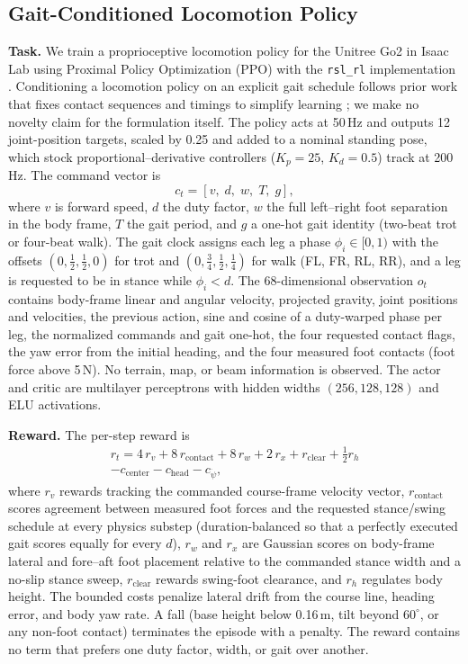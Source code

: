 \subsection{Gait-Conditioned Locomotion Policy}
\label{sec:inv3_policy}

\textbf{Task.} We train a proprioceptive locomotion policy for the Unitree Go2
in Isaac Lab using Proximal Policy Optimization (PPO) \cite{schulman2017ppo}
with the \texttt{rsl\_rl} implementation \cite{rudin2022walking}. Conditioning a
locomotion policy on an explicit gait schedule follows prior work that fixes
contact sequences and timings to simplify learning
\cite{yu2026discovery,aractingi2023controlling}; we make no novelty claim for
the formulation itself. The policy acts at 50\,Hz and outputs 12 joint-position
targets, scaled by 0.25 and added to a nominal standing pose, which stock
proportional--derivative controllers ($K_p=25$, $K_d=0.5$) track at 200\,Hz.
The command vector is
\begin{equation}
c_t = [v,\; d,\; w,\; T,\; g],
\end{equation}
where $v$ is forward speed, $d$ the duty factor, $w$ the full left--right foot
separation in the body frame, $T$ the gait period, and $g$ a one-hot gait
identity (two-beat trot or four-beat walk). The gait clock assigns each leg a
phase $\phi_i\in[0,1)$ with the offsets $(0,\tfrac12,\tfrac12,0)$ for trot and
$(0,\tfrac34,\tfrac12,\tfrac14)$ for walk (FL, FR, RL, RR), and a leg is
requested to be in stance while $\phi_i<d$. The 68-dimensional observation
$o_t$ contains body-frame linear and angular velocity, projected gravity, joint
positions and velocities, the previous action, sine and cosine of a
duty-warped phase per leg, the normalized commands and gait one-hot, the four
requested contact flags, the yaw error from the initial heading, and the four
measured foot contacts (foot force above 5\,N). No terrain, map, or beam
information is observed. The actor and critic are multilayer perceptrons with
hidden widths $(256,128,128)$ and ELU activations.

\textbf{Reward.} The per-step reward is
\begin{multline}
r_t = 4\,r_{v} + 8\,r_{\mathrm{contact}} + 8\,r_{w} + 2\,r_{x} + r_{\mathrm{clear}}
      + \tfrac12 r_{h} \\
      - c_{\mathrm{center}} - c_{\mathrm{head}} - c_{\dot\psi},
\label{eq:inv3_reward}
\end{multline}
where $r_v$ rewards tracking the commanded course-frame velocity vector,
$r_{\mathrm{contact}}$ scores agreement between measured foot forces and the
requested stance/swing schedule at every physics substep (duration-balanced so
that a perfectly executed gait scores equally for every $d$), $r_w$ and $r_x$
are Gaussian scores on body-frame lateral and fore--aft foot placement
relative to the commanded stance width and a no-slip stance sweep, $r_{\mathrm{clear}}$
rewards swing-foot clearance, and $r_h$ regulates body height. The bounded costs
penalize lateral drift from the course line, heading error, and body yaw rate.
A fall (base height below 0.16\,m, tilt beyond $60^\circ$, or any non-foot
contact) terminates the episode with a penalty. The reward contains no term
that prefers one duty factor, width, or gait over another.

